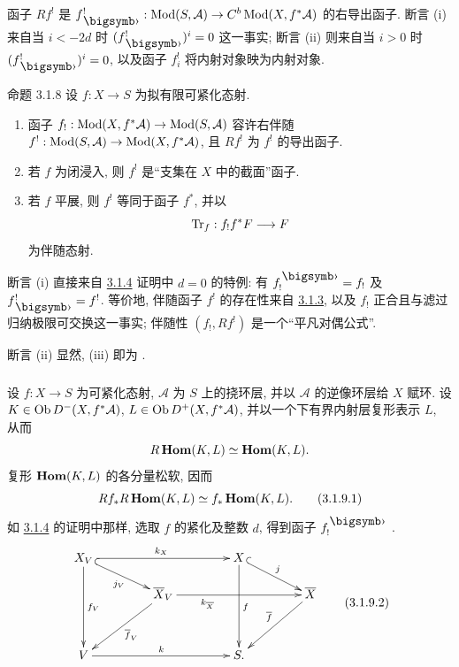 函子 $Rf^{!}$ 是 $f^{!}_{\bigdot}:\Mod(S,\mathcal{A})\rightarrow
C^{b}\Mod(X,f^{\ast}\mathcal{A})$ 的右导出函子. 断言 (i) 来自当 $i<-2d$ 时 $(f^{!}_{\bigdot})^{i}=0$ 这一事实; 断言 (ii) 则来自当 $i>0$ 时 $(f^{!}_{\bigdot})^{i}=0$, 以及函子 $f^{!}_{i}$ 将内射对象映为内射对象.

\hypertarget{sga4.exp.XVIII.proposition.3.1.8}{}\begin{enonce*}{命题 3.1.8}
设 $f:X\rightarrow S$ 为拟有限可紧化态射.
\begin{enumerate}
\renewcommand{\theenumi}{\roman{enumi}}
\renewcommand{\labelenumi}{(\theenumi)}
\item 函子 $f_{!}:\operatorname{Mod}(X,f^{\ast}\mathcal{A})\rightarrow
\operatorname{Mod}(S,\mathcal{A})$ 容许右伴随 $f^{!}:\operatorname{Mod}(S,\mathcal{A})\rightarrow \operatorname{Mod}(X,f^{\ast}\mathcal{A})$, 且 $Rf^{!}$ 为 $f^{!}$ 的导出函子.

\item 若 $f$ 为闭浸入, 则 $f^{!}$ 是“支集在 $X$ 中的截面”函子.

\item 若 $f$ 平展, 则 $f^{!}$ 等同于函子 $f^{\ast}$, 并以
$$
\operatorname{Tr}_{f}:f_{!}f^{\ast}F\longrightarrow F
$$
为伴随态射.
\end{enumerate}
\end{enonce*}

断言 (i) 直接来自 \hyperref[XVIII.thm3.1.4]{3.1.4} 证明中 $d=0$ 的特例: 有 $f^{\bigdot}_{!}=f_{!}$ 及 $f^{!}_{\bigdot}=f^{!}$. 等价地, 伴随函子 $f^{!}$ 的存在性来自 \hyperref[XVIII.lem3.1.3]{3.1.3}, 以及 $f_{!}$ 正合\pageoriginale 且与滤过归纳极限可交换这一事实; 伴随性 $(f_{!},Rf^{!})$ 是一个“平凡对偶公式”.

断言 (ii) 显然, (iii) 即为 .

\setcounter{subsubsection}{8}
\subsubsection{}
设 $f:X\rightarrow S$ 为可紧化态射, $\mathcal{A}$ 为 $S$ 上的挠环层, 并以 $\mathcal{A}$ 的逆像环层给 $X$ 赋环. 设 $K\in \operatorname{Ob}
D^{-}(X,f^{\ast}\mathcal{A})$, $L\in \operatorname{Ob} D^{+}(X,f^{\ast}\mathcal{A})$, 并以一个下有界内射层复形表示 $L$, 从而
$$
R\operatorname{\mathbf{Hom}}(K,L)\simeq \operatorname{\mathbf{Hom}}(K,L){}.
$$
复形 $\operatorname{\mathbf{Hom}}(K,L)$ 的各分量松软, 因而
\begin{equation*}
Rf_{\ast}R\operatorname{\mathbf{Hom}}(K,L)\simeq f_{\ast}\operatorname{\mathbf{Hom}}(K,L){}.\tag{3.1.9.1}
\end{equation*}%
如 \hyperref[XVIII.thm3.1.4]{3.1.4} 的证明中那样, 选取 $f$ 的紧化及整数 $d$, 得到函子 $f^{\bigdot}_{!}$ .
\begin{equation*}
\vcenter{
\xymatrix@C=1.5cm@R=.5cm{
X_V \ar[rr]^{k_X} \ar@{^{(}->}[rd]_{j_V} \ar[ddd]^{f_V}&      & X\ar[ddd]^{f} \ar@{^{(}->}[rd]^{j}         \\
    & \bar{X}_V \ar[ldd]^{\bar{f}_V} \ar[rr]_(.3){k_{\bar{X}}}   &   & \bar{X} \ar[ldd]_{\bar{f}}\\
    &         &        &\\
V  \ar[rr]^{k} &      & S.
}}\tag{3.1.9.2}
\end{equation*}

